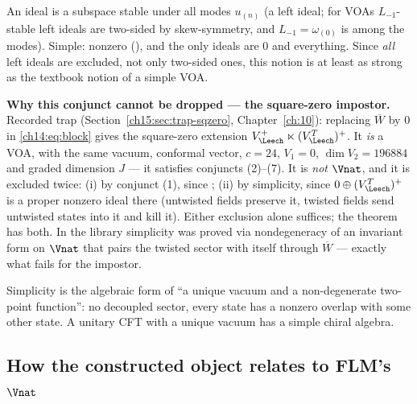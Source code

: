 \begin{dictionary}
An ideal is a subspace stable under all modes $u_{(n)}$ (a left ideal; for VOAs $L_{-1}$-stable left ideals
are two-sided by skew-symmetry, and $L_{-1}=\omega_{(0)}$ is among the modes).  Simple: nonzero
(), and the only ideals are $0$ and everything.  Since \emph{all} left ideals are excluded, not
only two-sided ones, this notion is at least as strong as the textbook notion of a simple VOA.

\textbf{Why this conjunct cannot be dropped — the square-zero impostor.}  Recorded trap (Section~\ref{ch15:sec:trap-sqzero},
Chapter~\ref{ch:10}): replacing $\overline W$ by $0$ in \eqref{ch14:eq:block} gives the square-zero
extension $V_\Leech^+\ltimes(V_\Leech^T)^+$.  It \emph{is} a VOA, with the same vacuum, conformal vector,
$c=24$, $V_1=0$, $\dim V_2=196884$ and graded dimension $J$ — it satisfies conjuncts (2)--(7).  It is
\emph{not} $\Vnat$, and it is excluded twice: (i) by conjunct (1), since ; (ii) by simplicity,
since $0\oplus(V_\Leech^T)^+$ is a proper nonzero ideal there (untwisted fields preserve it, twisted fields
send untwisted states into it and kill it).  Either exclusion alone suffices; the theorem has both.
In the library simplicity was proved via nondegeneracy of an invariant form on $\Vnat$ that pairs the twisted
sector with itself through $\overline W$ — exactly what fails for the impostor.
\end{dictionary}

\begin{physics}
Simplicity is the algebraic form of ``a unique vacuum and a non-degenerate two-point function'': no
decoupled sector, every state has a nonzero overlap with some other state.  A unitary CFT with a
unique vacuum has a simple chiral algebra.
\end{physics}

\subsection{\texorpdfstring{How the constructed object relates to FLM's $\Vnat$}{How the constructed object relates to FLM's V-natural}}

